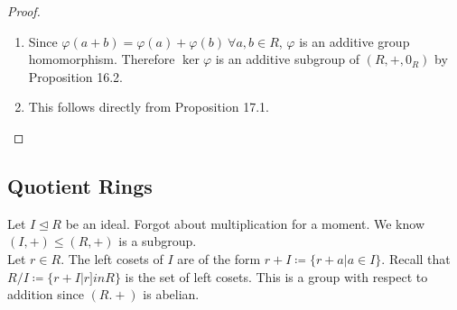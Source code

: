 \documentclass{article}
\newcommand{\coleq}{\coloneqq}
\theoremstyle{definition}
\theoremstyle{remark}
\newcommand{\ideal}{\unlhd}
\begin{document}
{{            \begin{proof}
                \begin{enumerate}
                    \item Since $\varphi(a+b)=\varphi(a)+\varphi(b) \ \forall a,b \in R$, $\varphi$ is an additive group homomorphism. Therefore $\ker\varphi$ is an additive subgroup of $(R,+,0_R)$ by Proposition 16.2.
                    \item This follows directly from Proposition 17.1.
                \end{enumerate}
            \end{proof}
        }
        \subsection*{Quotient Rings}{
            Let $I\ideal R$ be an ideal. Forgot about multiplication for a moment. We know $(I,+)\leq (R,+)$ is a subgroup.\\
            Let $r \in R$. The left cosets of $I$ are of the form $r+I\coleq \{r+a|a \in I\}$. Recall that $R/I\coleq\{r+I|r ]in R\}$ is the set of left cosets. This is a group with respect to addition since $(R.+)$ is abelian.
        }
    }
\end{document}
